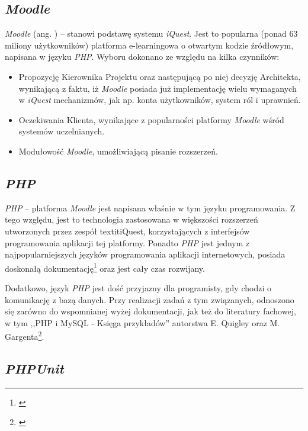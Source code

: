 \subsection{\textit{Moodle}}
\label{Chapter631}

\textit{Moodle} (ang. ) -- stanowi podstawę systemu \textit{iQuest}. Jest to popularna (ponad 63 miliony użytkowników) platforma e-learningowa o otwartym kodzie źródłowym, napisana w języku \emph{PHP}. Wyboru dokonano ze względu na kilka czynników:
\begin{itemize}
\item{Propozycję Kierownika Projektu oraz następującą po niej decyzję Architekta, wynikającą z faktu, iż \textit{Moodle} posiada już implementację wielu wymaganych w \textit{iQuest} mechanizmów, jak np. konta użytkowników, system ról i uprawnień.}
\item{Oczekiwania Klienta, wynikające z popularności platformy \textit{Moodle} wśród systemów uczelnianych.}
\item{Modułowość \textit{Moodle}, umożliwiającą pisanie rozszerzeń.}
\end{itemize}

\subsection{\textit{PHP}}
\label{Chapter632}

\textit{PHP} -- platforma \textit{Moodle} jest napisana właśnie w tym języku programowania. Z tego względu, jest to technologia zastosowana w większości rozszerzeń utworzonych przez zespół textit{iQuest}, korzystających z interfejsów programowania aplikacji tej platformy. Ponadto \textit{PHP} jest jednym z najpopularniejszych języków programowania aplikacji internetowych, posiada doskonałą dokumentację\footnote{\cite{Man:PHP}} oraz jest cały czas rozwijany.

Dodatkowo, język \textit{PHP} jest dość przyjazny dla programisty, gdy chodzi o komunikację z bazą danych. Przy realizacji zadań z tym związanych, odnoszono się zarówno do wspomnianej wyżej dokumentacji, jak też do literatury fachowej, w tym ,,PHP i MySQL - Księga przykładów'' autorstwa E. Quigley oraz M. Gargenta\footnote{\cite{EQMG:PiMKp07}}.

\subsection{\textit{PHPUnit}}
\label{Chapter633}

